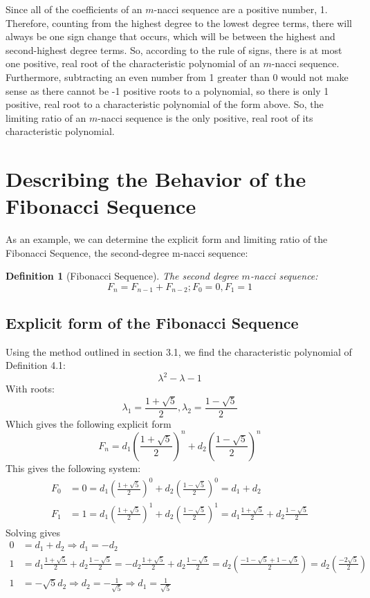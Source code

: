 \documentclass[11pt]{article}
\newtheorem{definition}[theorem]{Definition}
\begin{document}
Since all of the coefficients of an \(m\)-nacci sequence are a positive number, 1. Therefore, counting from the highest degree to the lowest degree terms, there will always be one sign change that occurs, which will be between the highest and second-highest degree terms. So, according to the rule of signs, there is at most one positive, real root of the characteristic polynomial of an \(m\)-nacci sequence. 
Furthermore, subtracting an even number from 1 greater than 0 would not make sense as there cannot be -1 positive roots to a polynomial, so there is only 1 positive, real root to a characteristic polynomial of the form above. So, the limiting ratio of an \(m\)-nacci sequence is the only positive, real root of its characteristic polynomial.



\section{Describing the Behavior of the Fibonacci Sequence}

As an example, we can determine the explicit form and limiting ratio of the Fibonacci Sequence, the second-degree m-nacci sequence:

\begin{definition}[Fibonacci Sequence]The second degree \(m\)-nacci sequence:
    \[F_n=F_{n-1}+F_{n-2}; F_0=0, F_1=1\]
\end{definition}

\subsection{Explicit form of the Fibonacci Sequence}
Using the method outlined in section 3.1, we find the characteristic polynomial of Definition 4.1:
$$\lambda^2-\lambda-1$$
With roots:
$$\lambda_1=\frac{1+\sqrt{5}}{2},\lambda_2=\frac{1-\sqrt{5}}{2}$$
Which gives the following explicit form
$$F_n=d_1\left(\frac{1+\sqrt{5}}{2}\right)^n+d_2\left(\frac{1-\sqrt{5}}{2}\right)^n$$
This gives the following system:
\begin{align*}
    F_0&=0=d_1\left(\frac{1+\sqrt{5}}{2}\right)^0+d_2\left(\frac{1-\sqrt{5}}{2}\right)^0 = d_1+d_2 \\
    F_1&=1=d_1\left(\frac{1+\sqrt{5}}{2}\right)^1+d_2\left(\frac{1-\sqrt{5}}{2}\right)^1 = d_1\frac{1+\sqrt{5}}{2}+d_2\frac{1-\sqrt{5}}{2}
\end{align*}
Solving gives 
\begin{align*}
    0 &= d_1+d_2 \Rightarrow d_1=-d_2\\
    1 &= d_1\frac{1+\sqrt{5}}{2}+d_2\frac{1-\sqrt{5}}{2} = -d_2\frac{1+\sqrt{5}}{2}+d_2\frac{1-\sqrt{5}}{2}= d_2\left(\frac{-1-\sqrt{5}+1-\sqrt{5}}{2}\right)= d_2\left(\frac{-2\sqrt{5}}{2}\right) \\
    1 &= -\sqrt{5}d_2\Rightarrow d_2=-\frac{1}{\sqrt{5}} \Rightarrow d_1=\frac{1}{\sqrt{5}}
\end{align*}
\end{document}
